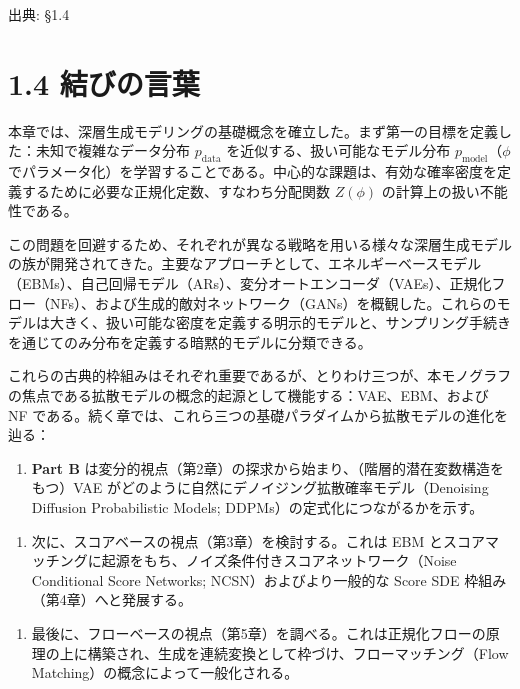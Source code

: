 

{\color{gray}\footnotesize 出典: §1.4\par}
\vspace{0.2em}

\section*{1.4 結びの言葉}


本章では、深層生成モデリングの基礎概念を確立した。まず第一の目標を定義した：未知で複雑なデータ分布 $p_{\mathrm{data}}$ を近似する、扱い可能なモデル分布 $p_{\mathrm{model}}$（$\phi$ でパラメータ化）を学習することである。中心的な課題は、有効な確率密度を定義するために必要な正規化定数、すなわち分配関数 $Z(\phi)$ の計算上の扱い不能性である。

この問題を回避するため、それぞれが異なる戦略を用いる様々な深層生成モデルの族が開発されてきた。主要なアプローチとして、エネルギーベースモデル（EBMs）、自己回帰モデル（ARs）、変分オートエンコーダ（VAEs）、正規化フロー（NFs）、および生成的敵対ネットワーク（GANs）を概観した。これらのモデルは大きく、扱い可能な密度を定義する明示的モデルと、サンプリング手続きを通じてのみ分布を定義する暗黙的モデルに分類できる。

これらの古典的枠組みはそれぞれ重要であるが、とりわけ三つが、本モノグラフの焦点である拡散モデルの概念的起源として機能する：VAE、EBM、および NF である。続く章では、これら三つの基礎パラダイムから拡散モデルの進化を辿る：

\begin{enumerate}
\item \textbf{Part B} は変分的視点（第2章）の探求から始まり、（階層的潜在変数構造をもつ）VAE がどのように自然にデノイジング拡散確率モデル（Denoising Diffusion Probabilistic Models; DDPMs）の定式化につながるかを示す。
\end{enumerate}


\begin{enumerate}
\item 次に、スコアベースの視点（第3章）を検討する。これは EBM とスコアマッチングに起源をもち、ノイズ条件付きスコアネットワーク（Noise Conditional Score Networks; NCSN）およびより一般的な Score SDE 枠組み（第4章）へと発展する。
\end{enumerate}


\begin{enumerate}
\item 最後に、フローベースの視点（第5章）を調べる。これは正規化フローの原理の上に構築され、生成を連続変換として枠づけ、フローマッチング（Flow Matching）の概念によって一般化される。
\end{enumerate}


